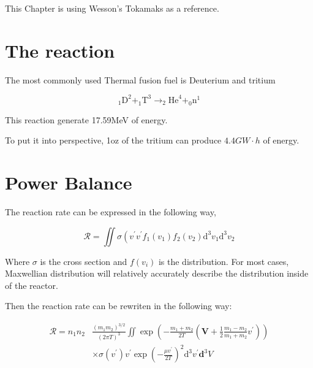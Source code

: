 This Chapter is using Wesson's Tokamaks as a reference. 

\section{The reaction}

The most commonly used Thermal fusion fuel is Deuterium and tritium

\begin{equation}
_{1} \mathrm{D}^{2}+_{1} \mathrm{T}^{3} \rightarrow_{2} \mathrm{He}^{4}+_0\mathrm{n}^{1}
\end{equation}

This reaction generate 17.59MeV of energy. 


To put it into perspective, 1oz of the tritium can produce $4.4GW\cdot h$ of energy. 

\section{Power Balance}

The reaction rate can be expressed in the following way, 

\begin{equation}
\mathcal{R}=\iint \sigma\left(v^{\prime} v^{\prime} f_{1}\left(v_{1}\right) f_{2}\left(v_{2}\right) \mathrm{d}^{3} v_{1} \mathrm{d}^{3} v_{2}\right.
\end{equation}

Where $\sigma$ is the cross section and $f(v_i)$ is the distribution. For most cases, Maxwellian distribution will relatively accurately describe the distribution inside of the reactor. 

Then the reaction rate can be rewriten in the following way: 

\begin{equation}
\begin{aligned} \mathcal{R}=n_{1} n_{2} & \frac{\left(m_{1} m_{2}\right)^{3 / 2}}{(2 \pi T)^{3}} \iint \exp \left(-\frac{m_{1}+m_{2}}{2 T}\left(\mathbf{V}+\frac{1}{2} \frac{m_{1}-m_{2}}{m_{1}+m_{2}} v^{\prime}\right)\right) \\ & \times \sigma\left(v^{\prime}\right) v^{\prime} \exp \left(-\frac{\mu v^{\prime}}{2 T}\right)^{2} \mathrm{d}^{3} v^{\prime} \mathbf{d}^{3} V \end{aligned}
\end{equation}

